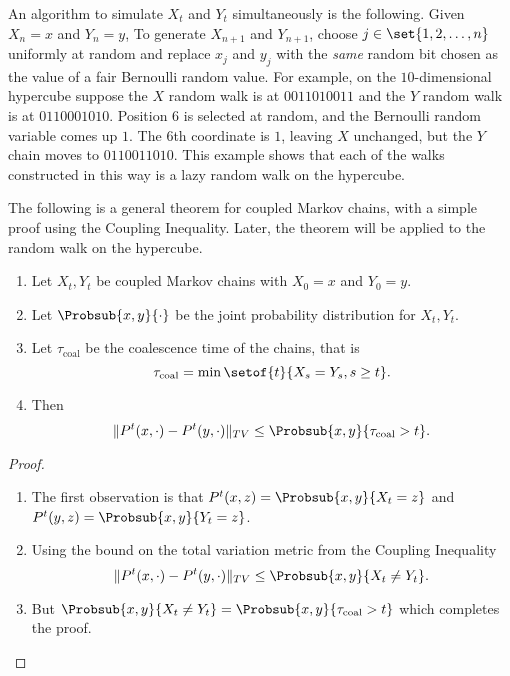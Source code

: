 \documentclass[12pt]{article}
\begin{document}
An algorithm to simulate \( X_t \) and \( Y_t \) simultaneously is the
following.  Given \( X_n = x \) and \( Y_n = y \), To generate \( X_{n+1}
\) and \( Y_{n+1} \), choose \( j \in \set{1, 2, \dots, n} \) uniformly
at random and replace \( x_j \) and \( y_j \) with the \emph{same}
random bit chosen as the value of a fair Bernoulli random value. For
example, on the \( 10 \)-dimensional hypercube suppose the \( X \)
random walk is at \( 0011010011 \) and the \( Y \) random walk is at \(
0110001010 \).  Position \( 6 \) is selected at random, and the
Bernoulli random variable comes up \( 1 \).  The \( 6 \)th coordinate is
\( 1 \), leaving \( X \) unchanged, but the \( Y \) chain moves to \(
0110011010 \).  This example shows that each of the walks constructed in
this way is a lazy random walk on the hypercube.

The following is a general theorem for coupled Markov chains, with a
simple proof using the Coupling Inequality.  Later, the theorem will be
applied to the random walk on the hypercube.
\begin{theorem}
    \begin{enumerate}
        \item
            Let \( X_t, Y_t \) be coupled Markov chains with \( X_0 = x \)
            and \( Y_0 = y \).
        \item
            Let \( \Probsub{x,y}{\cdot} \) be the joint probability
            distribution for \( X_t, Y_t \).
        \item
            Let \( \tau_{\text{coal}} \) be the coalescence time of the
            chains, that is
            \[
                \tau_{\text{coal}} = \min \setof{t}{X_s = Y_s, s \ge t}.
            \]
        \item
            Then
            \[
                \| P^t(x, \cdot) - P^t(y,\cdot)\|_{TV} \le \Probsub{x,y}
                {\tau_{\text{coal}} > t}.
            \]
    \end{enumerate}
\end{theorem}

\begin{proof}
    \begin{enumerate}
        \item
            The first observation is that \( P^t(x, z) = \Probsub{x,y}{X_t
            = z} \) and \( P^t(y, z) = \Probsub{x,y}{Y_t = z} \).
        \item
            Using the bound on the total variation metric from the
            Coupling Inequality
            \[
                \| P^t(x, \cdot) - P^t(y,\cdot)\|_{TV} \le \Probsub{x,y}
                {X_t \ne Y_t}.
            \]
        \item
            But \( \Probsub{x,y}{X_t \ne Y_t} = \Probsub{x,y}{\tau_{\text
            {coal}} > t} \) which completes the proof.
    \end{enumerate}
\end{proof}
\end{document}
